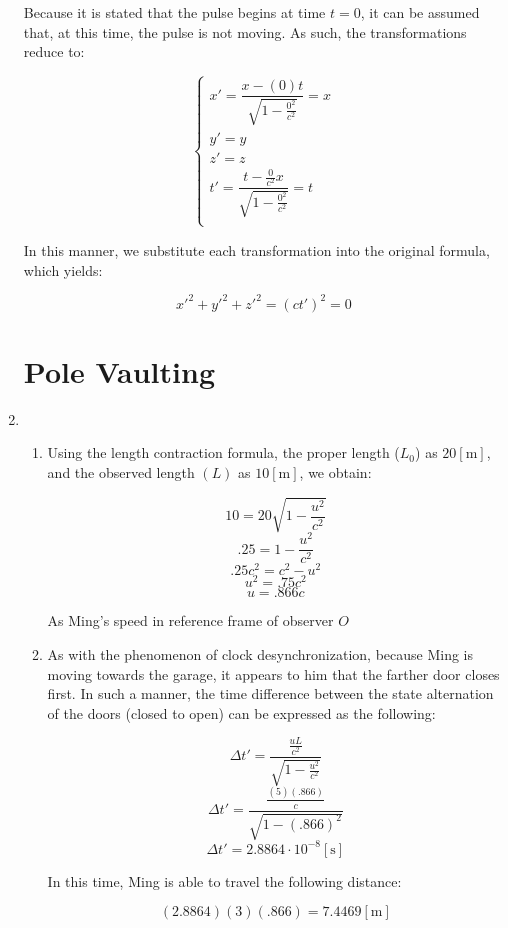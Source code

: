 \begin{enumerate}
        Because it is stated that the pulse begins at time $t=0$, it can be assumed that, at this time, the pulse is not moving. As such, the transformations reduce to:

        $$\left\{\begin{array}{l}x'=\dfrac{x-(0)t}{\sqrt{1-\frac{0^2}{c^2}}}=x\\y'=y\\z'=z\\t'=\dfrac{t-\frac{0}{c^2}x}{\sqrt{1-\frac{0^2}{c^2}}}=t\\ \end{array}$$

          In this manner, we substitute each transformation into the original formula, which yields:

          $$\boxed{x'^2+y'^2+z'^2=(ct')^2=0}$$

    \section{Pole Vaulting}

  \item

    \begin{enumerate}

      \item Using the length contraction formula, the proper length ($L_0$) as $20[\si{\meter}]$, and the observed length $(L)$ as $10[\si{\meter}]$, we obtain:

        $$10 = 20\sqrt{1-\dfrac{u^2}{c^2}}$$
        $$.25=1-\dfrac{u^2}{c^2}$$
        $$.25c^2=c^2-u^2$$
        $$u^2=.75c^2$$
        $$\boxed{u=.866c}$$

        As Ming's speed in reference frame of observer $O$

      \item As with the phenomenon of clock desynchronization, because Ming is moving towards the garage, it appears to him that the farther door closes first. In such a manner, the time difference between the state alternation of the doors (closed to open) can be expressed as the following:

        $$\Delta t'=\dfrac{\frac{uL}{c^2}}{\sqrt{1-\frac{u^2}{c^2}}}$$
        $$\Delta t'= \frac{\frac{(5)(.866)}{c}}{\sqrt{1-(.866)^2}}$$
        $$\Delta t'= 2.8864\cdot10^{-8}[\si{\second}]$$

        In this time, Ming is able to travel the following distance:

        $$(2.8864)(3)(.866)=7.4469[\si{\meter}]$$


\end{enumerate}
\end{enumerate}
